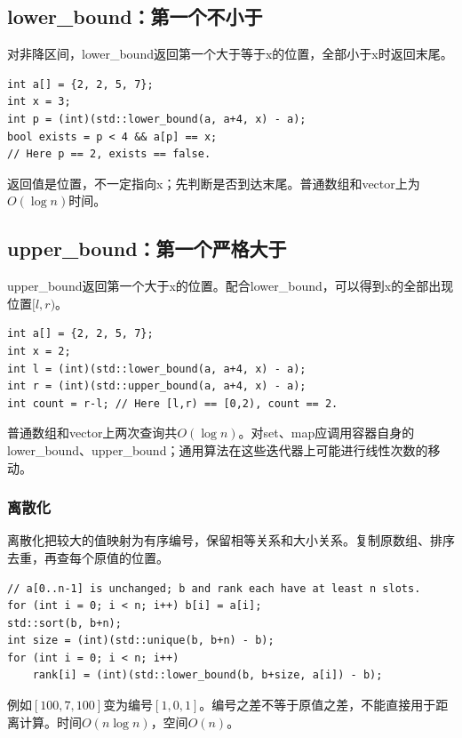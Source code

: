 \documentclass[UTF8,11pt,a4paper,fontset=none]{ctexart}
\begin{document}
\subsection{lower\_bound：第一个不小于}
对非降区间，lower\_bound返回第一个大于等于x的位置，全部小于x时返回末尾。
\par\noindent\begin{minipage}{\linewidth}
\begin{lstlisting}
int a[] = {2, 2, 5, 7};
int x = 3;
int p = (int)(std::lower_bound(a, a+4, x) - a);
bool exists = p < 4 && a[p] == x;
// Here p == 2, exists == false.
\end{lstlisting}
\end{minipage}\par
返回值是位置，不一定指向x；先判断是否到达末尾。普通数组和vector上为$O(\log n)$时间。
\subsection{upper\_bound：第一个严格大于}
upper\_bound返回第一个大于x的位置。配合lower\_bound，可以得到x的全部出现位置$[l,r)$。
\par\noindent\begin{minipage}{\linewidth}
\begin{lstlisting}
int a[] = {2, 2, 5, 7};
int x = 2;
int l = (int)(std::lower_bound(a, a+4, x) - a);
int r = (int)(std::upper_bound(a, a+4, x) - a);
int count = r-l; // Here [l,r) == [0,2), count == 2.
\end{lstlisting}
\end{minipage}\par
普通数组和vector上两次查询共$O(\log n)$。对set、map应调用容器自身的lower\_bound、upper\_bound；通用算法在这些迭代器上可能进行线性次数的移动。

\subsubsection{离散化}
离散化把较大的值映射为有序编号，保留相等关系和大小关系。复制原数组、排序去重，再查每个原值的位置。
\par\noindent\begin{minipage}{\linewidth}
\begin{lstlisting}
// a[0..n-1] is unchanged; b and rank each have at least n slots.
for (int i = 0; i < n; i++) b[i] = a[i];
std::sort(b, b+n);
int size = (int)(std::unique(b, b+n) - b);
for (int i = 0; i < n; i++)
    rank[i] = (int)(std::lower_bound(b, b+size, a[i]) - b);
\end{lstlisting}
\end{minipage}\par
例如$[100,7,100]$变为编号$[1,0,1]$。编号之差不等于原值之差，不能直接用于距离计算。时间$O(n\log n)$，空间$O(n)$。
\end{document}
